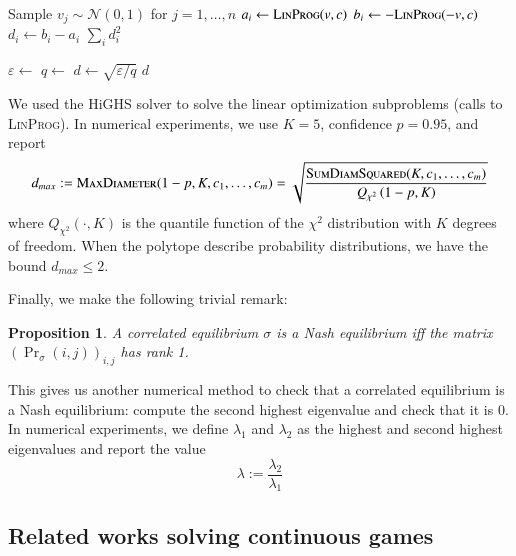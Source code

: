 \documentclass[preprint,12pt,authoryear]{elsarticle}
\newtheorem{proposition}[theorem]{Proposition}
\theoremstyle{definition}
\begin{document}
\begin{algorithm}
\label{alg:diameters}
\caption{Confidence interval on $diam(P)$}
\begin{algorithmic}
    \State Sample $v_j \sim \mathcal{N}(0, 1)$ for $j=1,\ldots,n$
    \State $a_i \gets \textsc{LinProg}(v, c)$ 
    \State $b_i \gets -\textsc{LinProg}(-v, c)$ 
    \State $d_i \gets b_i - a_i$
\EndFor
\State \Return $\sum_i d_i^2$
\EndFunction
{}

\State $\varepsilon \gets$ 
\State $q \gets$ 
\State $d \gets \sqrt{\varepsilon / q}$
\State \Return $d$
\EndFunction
\end{algorithmic}
\end{algorithm}

We used the HiGHS solver \citep{huangfu2018parallelizing} to solve the linear optimization subproblems (calls to \textsc{LinProg}). In numerical experiments, we use $K=5$, confidence $p=0.95$, and report $$d_{max} :=  \textsc{MaxDiameter}(1-p, K, c_1, \ldots, c_m) = \sqrt{\frac{\textsc{SumDiamSquared}(K, c_1, \ldots, c_m)} {Q_{\chi^2}\left(1-p, K\right)}}$$ where $Q_{\chi^2}(\cdot, K)$ is the quantile function of the $\chi^2$ distribution with $K$ degrees of freedom. When the polytope describe probability distributions, we have the bound $d_{max} \leq 2$.

Finally, we make the following trivial remark:

\begin{proposition}
    A correlated equilibrium $\sigma$ is a Nash equilibrium iff the matrix $(\Pr\nolimits_\sigma(i, j))_{i,j}$ has rank 1.
\end{proposition}

This gives us another numerical method to check that a correlated equilibrium is a Nash equilibrium: compute the second highest eigenvalue and check that it is $0$. In numerical experiments, we define $\lambda_1$ and $\lambda_2$ as the highest and second highest eigenvalues and report the value $$\lambda := \frac{\lambda_2}{\lambda_1}$$

\subsection{Related works solving continuous games}
\end{document}
